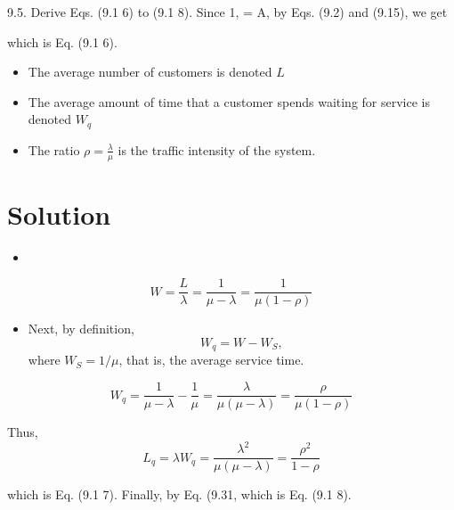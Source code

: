 

\large 




9.5. Derive Eqs. (9.1 6) to (9.1 8). 
Since 1, = A, by Eqs. (9.2) and (9.15), we get 

which is Eq. (9.1 6).

\begin{framed}
\begin{itemize}
\item The average number of customers is denoted $L$
\item The average amount of time that a customer spends waiting for service is denoted $W_q$
    \item  The ratio ${\rho = \frac{\lambda}{\mu}}$ is the traffic intensity of the system.
\end{itemize}
\end{framed}
\section*{Solution}
\begin{itemize}
    \item 
\end{itemize}
\[W =  \frac{L}{\lambda} = \frac{1}{\mu - \lambda } = \frac{1}{\mu(1-\rho)}\]
\begin{itemize}
    \item Next, by definition, 
\[W_q = W - W_S,\] 
where $\displaystyle {W_S = 1/\mu}$, that is, the average service time. 
\end{itemize}
\[{ \displaystyle W_q =   \frac{1}{\mu - \lambda } - \frac{1}{\mu }   = \frac{\lambda}{\mu(\mu - \lambda) } = \frac{\rho}{\mu(1- \rho) }
}\]

Thus, 
\[{ \displaystyle L_q =  \lambda W_q =   \frac{\lambda^2}{\mu(\mu - \lambda) } =\frac{\rho^2}{1- \rho }
}\]


which is Eq. (9.1 7). Finally, by Eq. (9.31, 
which is Eq. (9.1 8). 


